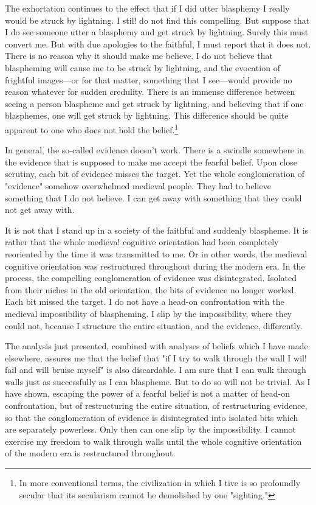 \documentclass[10pt,twoside,draft]{memoir}
\begin{document}
The exhortation continues to the effect that if I did utter blasphemy I 
really would be struck by lightning. I stil! do not find this compelling. But 
suppose that I do see someone utter a blasphemy and get struck by lightning. 
Surely this must convert me. But with due apologies to the faithful, I must 
report that it does not. There is no reason why it should make me believe. I 
do not believe that blaspheming will cause me to be struck by lightning, and 
the evocation of frightful images---or for that matter, something that I 
see---would provide no reason whatever for sudden credulity. There is an 
immense difference between seeing a person blaspheme and get struck by 
lightning, and believing that if one blasphemes, one will get struck by 
lightning. This difference should be quite apparent to one who does not hold 
the belief.\footnote{In more conventional terms, the civilization in which I tive is so 
profoundly secular that its secularism cannot be demolished by one 
"sighting."}

In general, the so-called evidence doesn't work. There is a swindle 
somewhere in the evidence that is supposed to make me accept the fearful 
belief. Upon close scrutiny, each bit of evidence misses the target. Yet the 
whole conglomeration of "evidence" somehow overwhelmed medieval 
people. They had to believe something that I do not believe. I can get away 
with something that they could not get away with. 

It is not that I stand up in a society of the faithful and suddenly 
blaspheme. It is rather that the whole medieva! cognitive orientation had 
been completely reoriented by the time it was transmitted to me. Or in other 
words, the medieval cognitive orientation was restructured throughout 
during the modern era. In the process, the compelling conglomeration of 
evidence was disintegrated. Isolated from their niches in the old orientation, 
the bits of evidence no longer worked. Each bit missed the target. I do not 
have a head-on confrontation with the medieval impossibility of 
blaspheming. I slip by the impossibility, where they could not, because I 
structure the entire situation, and the evidence, differently. 

The analysis just presented, combined with analyses of beliefs which I 
have made elsewhere, assures me that the belief that "if I try to walk 
through the wall I wil! fail and will bruise myself" is also discardable. I am 
sure that I can walk through walls just as successfully as I can blaspheme. 
But to do so will not be trivial. As I have shown, escaping the power of a 
fearful belief is not a matter of head-on confrontation, but of restructuring 
the entire situation, of restructuring evidence, so that the conglomeration of 
evidence is disintegrated into isolated bits which are separately powerless. 
Only then can one slip by the impossibility. I cannot exercise my freedom to 
walk through walls until the whole cognitive orientation of the modern era is 
restructured throughout. 
\end{document}
